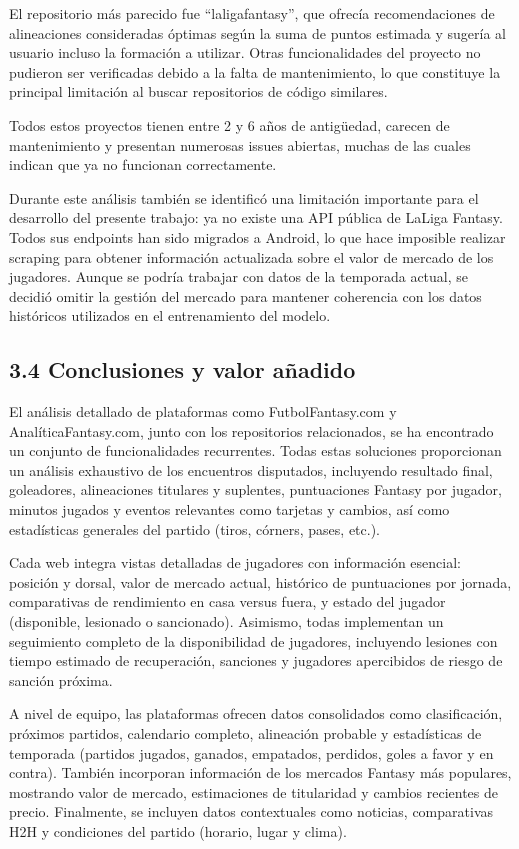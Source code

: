 El repositorio más parecido fue ``laligafantasy'', que ofrecía recomendaciones de alineaciones 
consideradas óptimas según la suma de puntos estimada y sugería al usuario incluso la formación a 
utilizar. Otras funcionalidades del proyecto no pudieron ser verificadas debido a la falta de 
mantenimiento, lo que constituye la principal limitación al buscar repositorios de código similares.

Todos estos proyectos tienen entre 2 y 6 años de antigüedad, carecen de mantenimiento y presentan 
numerosas issues abiertas, muchas de las cuales indican que ya no funcionan correctamente.

Durante este análisis también se identificó una limitación importante para el desarrollo del presente 
trabajo: ya no existe una API pública de LaLiga Fantasy. Todos sus endpoints han sido migrados a 
Android, lo que hace imposible realizar scraping para obtener información actualizada sobre el valor 
de mercado de los jugadores. Aunque se podría trabajar con datos de la temporada actual, se decidió 
omitir la gestión del mercado para mantener coherencia con los datos históricos utilizados en el 
entrenamiento del modelo.

\subsection{3.4 Conclusiones y valor añadido}

El análisis detallado de plataformas como FutbolFantasy.com y AnalíticaFantasy.com, junto con los repositorios relacionados, se ha encontrado un conjunto de 
funcionalidades recurrentes. Todas estas soluciones proporcionan un análisis exhaustivo de los 
encuentros disputados, incluyendo resultado final, goleadores, alineaciones titulares y suplentes, 
puntuaciones Fantasy por jugador, minutos jugados y eventos relevantes como tarjetas y cambios, así 
como estadísticas generales del partido (tiros, córners, pases, etc.).

Cada web integra vistas detalladas de jugadores con información esencial: posición y dorsal, 
valor de mercado actual, histórico de puntuaciones por jornada, comparativas de rendimiento en casa 
versus fuera, y estado del jugador (disponible, lesionado o sancionado). Asimismo, todas implementan 
un seguimiento completo de la disponibilidad de jugadores, incluyendo lesiones con tiempo estimado de 
recuperación, sanciones y jugadores apercibidos de riesgo de sanción próxima.

A nivel de equipo, las plataformas ofrecen datos consolidados como clasificación, próximos partidos, 
calendario completo, alineación probable y estadísticas de temporada (partidos jugados, ganados, 
empatados, perdidos, goles a favor y en contra). También incorporan información de los mercados 
Fantasy más populares, mostrando valor de mercado, estimaciones de titularidad y cambios recientes de 
precio. Finalmente, se incluyen datos contextuales como noticias, comparativas H2H y condiciones del 
partido (horario, lugar y clima).


